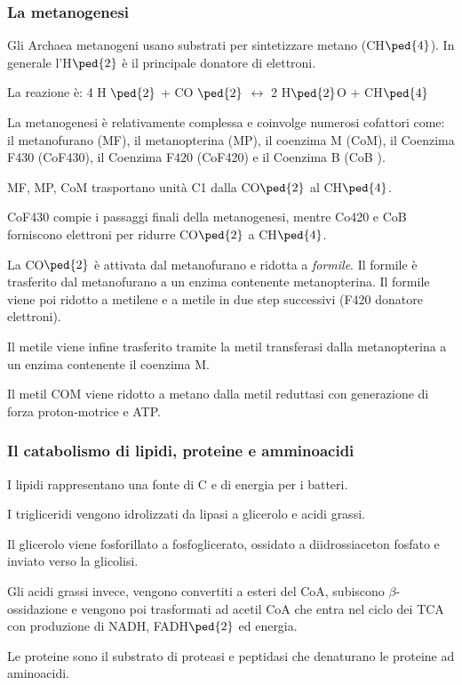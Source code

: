 \documentclass[11pt]{book}
\begin{document}
\subsubsection{La metanogenesi}
Gli Archaea metanogeni usano substrati per sintetizzare metano (CH$\ped{4}$). In generale l’H$\ped{2}$ è il principale donatore di elettroni.

La reazione è: 
4 H $\ped{2}$ + CO $\ped{2}$ $\longleftrightarrow$ 2 H$\ped{2}$O + CH$\ped{4}$ 


La metanogenesi è relativamente complessa e coinvolge numerosi cofattori come: il metanofurano (MF), il metanopterina (MP), il coenzima M (CoM), il Coenzima F430 (CoF430), il Coenzima F420 (CoF420) e il Coenzima B (CoB ). 

MF, MP, CoM trasportano unità C1 dalla CO$\ped{2}$ al CH$\ped{4}$.

CoF430 compie i passaggi finali della metanogenesi, mentre Co420 e CoB forniscono elettroni per ridurre CO$\ped{2}$ a CH$\ped{4}$.

La CO$\ped{2}$ è attivata dal metanofurano e ridotta a \emph{formile}.
Il formile è trasferito dal metanofurano a un enzima contenente metanopterina. Il formile viene poi ridotto a metilene e a metile in due step successivi (F420 donatore elettroni).

Il metile viene infine trasferito tramite la metil transferasi dalla metanopterina a un enzima contenente il coenzima M.

Il metil COM viene ridotto a metano dalla metil reduttasi con generazione di forza proton-motrice e ATP.


\subsubsection{Il catabolismo di lipidi, proteine e amminoacidi}
I lipidi rappresentano una fonte di C e di energia per i batteri. 

I trigliceridi vengono idrolizzati da lipasi a glicerolo e acidi grassi.

Il glicerolo viene fosforillato a fosfoglicerato, ossidato a diidrossiaceton fosfato e inviato verso la glicolisi.

Gli acidi grassi invece, vengono convertiti a esteri del CoA, subiscono $\beta$-ossidazione e vengono poi trasformati ad acetil CoA che entra nel ciclo dei TCA con produzione di NADH, FADH$\ped{2}$ ed energia.

Le proteine sono il substrato di proteasi e peptidasi che denaturano le proteine ad aminoacidi. 
\end{document}
